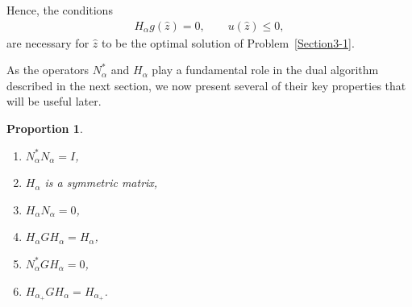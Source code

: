 \documentclass{article}
\newtheorem{proportion}{Proportion}
\begin{document}
	Hence, the conditions
	\begin{align}
		H_{\alpha} g(\hat{z}) = 0, \qquad u(\hat{z}) \leq 0,
	\end{align}
	are necessary for $\hat{z}$ to be the optimal solution of Problem~\eqref{Section3-1}.
	
	As the operators $N_{\alpha}^{\ast}$ and $H_{\alpha}$ play a fundamental role in the dual algorithm described in the next section, we now present several of their key properties that will be useful later.
	\begin{proportion}\label{Proportion of H}
		\begin{enumerate}
			\item $N_{\alpha}^{\ast}N_{\alpha} = I$,
			\item $H_{\alpha}$ is a symmetric matrix,
			\item $H_{\alpha}N_{\alpha} = 0$,
			\item $H_{\alpha}GH_{\alpha} = H_{\alpha}$,
			\item $N_{\alpha}^{\ast}GH_{\alpha} = 0$,
			\item $H_{\alpha_{+}}GH_{\alpha} = H_{\alpha_{+}}$.
		\end{enumerate}
	\end{proportion}
	
\end{document}
